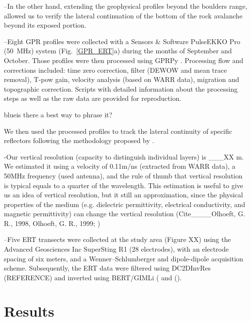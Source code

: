 \documentclass[5p]{elsarticle}
\newcommand{\COMON}{\begin{color}{blue}}
\newcommand{\COMOFF}{\end{color}}
\begin{document}
--In the other hand, extending the geophysical profiles beyond the boulders range,  allowed us to verify the lateral continuation of the bottom of the rock avalanche beyond its exposed portion. 



--Eight GPR profiles were collected with a Sensors \& Software PulseEKKO Pro (\SI{50}{\mega Hz}) system (Fig.~\ref{GPR_ERT}a) during the months of September and October. Those profiles were then processed using GPRPy \citep{plattner2019comunity}. Processing flow and corrections included: time zero correction, filter (DEWOW and mean trace removal), T-pow gain, velocity analysis (based on WARR data), migration \citep{stolt1978migration} and topographic correction. Scripts with detailed information about the processing steps as well as the raw data are provided for reproduction. \COMON is there a best way to phrase it? \COMOFF We then used the processed profiles to track the lateral continuity of specific reflectors following the methodology proposed by \citep{mitchum1977seismic}.
	
-Our vertical resolution (capacity to distinguish individual layers) is ___XX m. We estimated it using a velocity of 0.11m/ns (extracted from WARR data), a 50MHz frequency (used antenna), and the rule of thumb that vertical resolution is typical equals to a quarter of the wavelength. This estimation is useful to give us an idea of vertical resolution, but it still an approximation, since the physical properties of the medium (e.g. dielectric permittivity, electrical conductivity, and magnetic permittivity) can change the vertical resolution (Cite____Olhoeft, G. R., 1998, Olhoeft, G. R., 1999; \citep{neal2004ground})




--Five ERT transects were collected at the study area (Figure XX) using the Advanced Geosciences Inc SuperSting R1 (28 electrodes), with an electrode spacing of six meters, and a Wenner–Schlumberger and dipole-dipole acquisition scheme. Subsequently, the ERT data were filtered using DC2DInvRes (REFERENCE) and inverted using BERT/GIMLi (\cite{gunther2006three} and (\cite{Ruecker2017}).





  



\section{Results}
\end{document}
